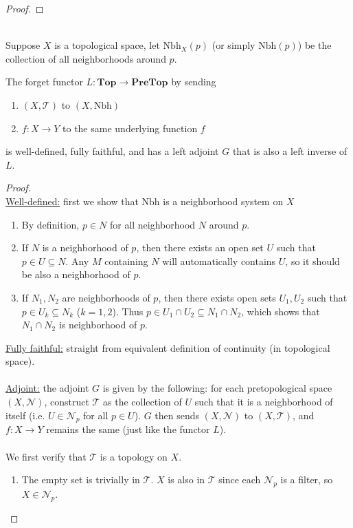 \documentclass{treatise}
\begin{document}
\begin{shaded}
\begin{proof}
\end{proof}
\ \\
Suppose $X$ is a topological space, let $\mathrm{Nbh}_X(p)$ (or simply $\mathrm{Nbh}(p)$) be the collection of all neighborhoods around $p$.
\begin{theorem}
The forget functor $L: \mathbf{Top} \to \mathbf{PreTop}$ by sending
\begin{enumerate}
    \item $(X, \mathcal{T})$ to $(X, \mathrm{Nbh})$
    \item $f: X \to Y$ to the same underlying function $f$
\end{enumerate}
is well-defined, fully faithful, and has a left adjoint $G$ that is also a left inverse of $L$.
\end{theorem}
\begin{proof} \ \\
\underline{Well-defined:} first we show that $\mathrm{Nbh}$ is a neighborhood system on $X$
\begin{enumerate}
    \item By definition, $p \in N$ for all neighborhood $N$ around $p$.
    \item If $N$ is a neighborhood of $p$, then there exists an open set $U$ such that $p \in U \subseteq N$. Any $M$ containing $N$ will automatically contains $U$, so it should be also a neighborhood of $p$.
    \item If $N_1, N_2$ are neighborhoods of $p$, then there exists open sets $U_1, U_2$ such that $p \in U_k \subseteq N_k$ ($k = 1, 2$). Thus $p \in U_1 \cap U_2 \subseteq N_1 \cap N_2$, which shows that $N_1 \cap N_2$ is neighborhood of $p$.
\end{enumerate}
\underline{Fully faithful:} straight from equivalent definition of continuity (in topological space).
\\
\\
\underline{Adjoint:} the adjoint $G$ is given by the following: for each pretopological space $(X, \mathcal{N})$, construct $\mathcal{T}$ as the collection of $U$ such that it is a neighborhood of itself (i.e. $U \in \mathcal{N}_p$ for all $p \in U$). $G$ then sends $(X, \mathcal{N})$ to $(X, \mathcal{T})$, and $f: X \to Y$ remains the same (just like the functor $L$).
\\
\\
We first verify that $\mathcal{T}$ is a topology on $X$.
\begin{enumerate}
    \item The empty set is trivially in $\mathcal{T}$. $X$ is also in $\mathcal{T}$ since each $\mathcal{N}_p$ is a filter, so $X \in \mathcal{N}_p$.

\end{enumerate}
\end{proof}
\end{shaded}
\end{document}
